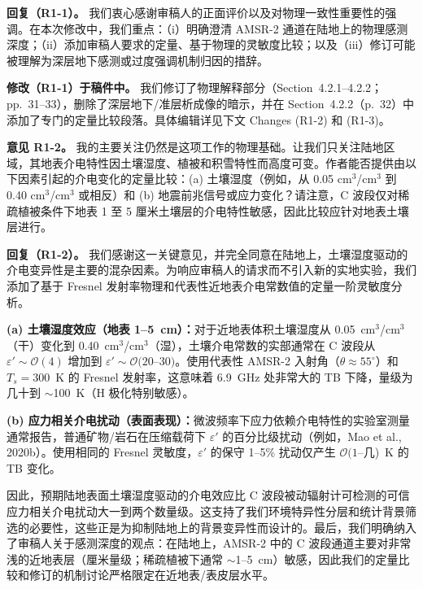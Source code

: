 \documentclass[11pt]{article}
\newcommand{\revcomment}[1]{\begingroup\color{commentcolor}#1\endgroup}
\newcommand{\revresponse}[1]{\begingroup\color{responsecolor}#1\endgroup}
\newcommand{\revchange}[1]{\begingroup\color{changecolor}#1\endgroup}
\begin{document}
\revresponse{%
\textbf{回复（R1-1）。}
我们衷心感谢审稿人的正面评价以及对物理一致性重要性的强调。在本次修改中，我们重点：（i）明确澄清 AMSR-2 通道在陆地上的物理感测深度；（ii）添加审稿人要求的定量、基于物理的灵敏度比较；以及（iii）修订可能被理解为深层地下感测或过度强调机制归因的措辞。
}

\revchange{%
\textbf{修改（R1-1）于稿件中。}
我们修订了物理解释部分（Section~4.2.1--4.2.2；pp.~31--33），删除了深层地下/准层析成像的暗示，并在 Section~4.2.2（p.~32）中添加了专门的定量比较段落。具体编辑详见下文 Changes (R1-2) 和 (R1-3)。
}

\bigskip

\revcomment{%
\textbf{意见 R1-2。}
我的主要关注仍然是这项工作的物理基础。让我们只关注陆地区域，其地表介电特性因土壤湿度、植被和积雪特性而高度可变。作者能否提供由以下因素引起的介电变化的定量比较：(a) 土壤湿度（例如，从 0.05 cm$^3$/cm$^3$ 到 0.40 cm$^3$/cm$^3$ 或相反）和 (b) 地震前兆信号或应力变化？请注意，C 波段仅对稀疏植被条件下地表 1 至 5 厘米土壤层的介电特性敏感，因此比较应针对地表土壤层进行。
}

\revresponse{%
\textbf{回复（R1-2）。}
我们感谢这一关键意见，并完全同意在陆地上，土壤湿度驱动的介电变异性是主要的混杂因素。为响应审稿人的请求而不引入新的实地实验，我们添加了基于 Fresnel 发射率物理和代表性近地表介电常数值的定量一阶灵敏度分析。

\medskip

\textbf{(a) 土壤湿度效应（地表 1--5~cm）：}对于近地表体积土壤湿度从 0.05~cm$^3$/cm$^3$（干）变化到 0.40~cm$^3$/cm$^3$（湿），土壤介电常数的实部通常在 C 波段从 $\varepsilon' \sim \mathcal{O}(4)$ 增加到 $\varepsilon' \sim \mathcal{O}(20$--$30)$。使用代表性 AMSR-2 入射角（$\theta \approx 55^\circ$）和 $T_s = 300$~K 的 Fresnel 发射率，这意味着 6.9~GHz 处非常大的 TB 下降，量级为几十到 $\sim$100~K（H 极化特别敏感）。

\medskip

\textbf{(b) 应力相关介电扰动（表面表现）：}微波频率下应力依赖介电特性的实验室测量通常报告，普通矿物/岩石在压缩载荷下 $\varepsilon'$ 的百分比级扰动（例如，Mao et al., 2020b）。使用相同的 Fresnel 灵敏度，$\varepsilon'$ 的保守 1--5\% 扰动仅产生 $\mathcal{O}(1$--几)~K 的 TB 变化。

\medskip

因此，预期陆地表面土壤湿度驱动的介电效应比 C 波段被动辐射计可检测的可信应力相关介电扰动大一到两个数量级。这支持了我们环境特异性分层和统计背景筛选的必要性，这些正是为抑制陆地上的背景变异性而设计的。最后，我们明确纳入了审稿人关于感测深度的观点：在陆地上，AMSR-2 中的 C 波段通道主要对非常浅的近地表层（厘米量级；稀疏植被下通常 $\sim$1--5~cm）敏感，因此我们的定量比较和修订的机制讨论严格限定在近地表/表皮层水平。
}
\end{document}

